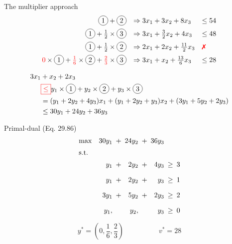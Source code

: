 \begin{frame}{The multiplier approach}
  \begin{equation*}
	\setlength\arraycolsep{5pt}
	\begin{array}{rll}
	  \circled{1} + \circled{2} &\Rightarrow	3x_1 + 3x_2 + 8x_3 & \leq 54 \\[5pt]
	  \circled{1} + \frac{1}{2} \times \circled{3} &\Rightarrow 3x_1 + \frac{3}{2}x_2 + 4x_3 & \leq 48 \\[5pt]
	  \circled{1} + \frac{1}{2} \times \circled{2} &\Rightarrow 2x_1 + 2x_2 + \frac{11}{2}x_3 & \text{\xmark{}} \\[5pt]
	  \red{0} \times \circled{1} + \red{\frac{1}{6}} \times \circled{2} + \red{\frac{2}{3}} \times \circled{3} &\Rightarrow 3x_1 + x_2 + \frac{13}{6}x_3 & \leq 28
	\end{array}
  \end{equation*}

  \begin{align*}
	3x_1 &+ x_2 + 2x_3	\\
	  &\rbox{\leq} y_1 \times \circled{1} + y_2 \times \circled{2} + y_3 \times \circled{3} \\
	  &= (y_1 + 2y_2 + 4y_3) x_1 + (y_1 + 2y_2 + y_3) x_2 + (3y_1 + 5y_2 + 2y_3)  \\
	  &\leq 30y_1 + 24y_2 + 36y_3
  \end{align*}
\end{frame}
\begin{frame}{Primal-dual (Eq. 29.86)}
  \begin{equation*}
	\setlength\arraycolsep{2.5pt}
	\begin{array}{l@{\quad}rcrcrcr}
	  \max 	& 30y_1  &+&	24y_2		&+&	36y_3	&	& 	\\[5pt]
	  \text{s.t.} 	&	&	&	&	&	&	&	\\[5pt]
			& y_1   &+&	2y_2	&+&	4y_3	&\geq& 3 \\[10pt]
			& y_1	&+&	2y_2 	&+& y_3 	&\geq& 1 \\[10pt]
			& 3y_1  &+&	5y_2	&+&	2y_3	&\geq& 2	\\[10pt]
			& y_1,	&&	y_2,	&&	y_3		&\geq&	0
	\end{array}
  \end{equation*}

  \vspace{0.60cm}

  \[
	y^{\ast} = (0, \frac{1}{6}, \frac{2}{3}) \qquad\qquad\quad v^{\ast} = 28
  \]
\end{frame}
